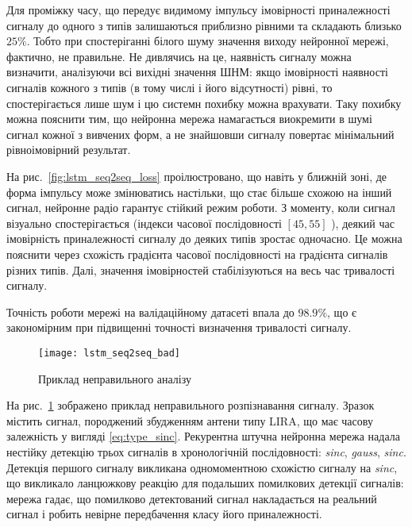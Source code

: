 Для проміжку часу, що передує видимому імпульсу імовірності приналежності 
сигналу до одного з типів залишаються 
приблизно рівними та складають близько $ 25 \% $. Тобто при спостеріганні 
білого шуму значення виходу нейронної мережі, фактично, не правильне. Не 
дивлячись на це, наявність сигналу можна визначити, аналізуючи всі вихідні 
значення ШНМ: якщо імовірності наявності сигналів кожного з типів (в тому 
числі і його відсутності) рівні, то спостерігається лише шум і цю системн 
похибку можна врахувати. Таку похибку можна пояснити тим, що нейронна мережа 
намагається виокремити в шумі сигнал кожної з вивчених форм, а не знайшовши 
сигналу повертає мінімальний рівноімовірний результат.

На рис.~\ref{fig:lstm_seq2seq_loss} проілюстровано, що навіть у ближній зоні, 
де форма імпульсу може змінюватись настільки, що стає більше схожою на інший 
сигнал, нейронне радіо гарантує стійкий режим роботи. З моменту, коли сигнал 
візуально спостерігається (індекси часової послідовності 
$ \left[ 45, 55 \right]$ ), деякий час імовірність приналежності сигналу до 
деяких типів зростає одночасно. Це можна пояснити через схожість 
градієнта часової послідовності на градієнта сигналів різних типів. Далі,
значення імовірностей стабілізуються на весь час тривалості сигналу.

Точність роботи мережі на валідаційному датасеті впала до $ 98.9\% $,
що є закономірним при підвищенні точності визначення тривалості сигналу.

\begin{figure}[htbp] \begin{center}
\texttt{[image: lstm\_seq2seq\_bad]}
\caption{Приклад неправильного аналізу} \label{fig:lstm_seq2seq_bad}
\end{center} \end{figure}

На рис.~\ref{fig:lstm_seq2seq_bad} зображено приклад неправильного
розпізнавання сигналу. Зразок містить сигнал, породжений збудженням антени 
типу LIRA, що має часову залежність у вигляді \eqref{eq:type_sinc}. 
Рекурентна штучна нейронна мережа надала нестійку
детекцію трьох сигналів в хронологічній послідовності: \textit{sinc}, 
\textit{gauss}, \textit{sinc}. Детекція першого сигналу викликана 
одномоментною схожістю сигналу на \textit{sinc}, що викликало ланцюжкову 
реакцію для подальших помилкових детекції сигналів: мережа гадає, що 
помилково детектований сигнал накладається на реальний сигнал і робить 
невірне передбачення класу його приналежності.

